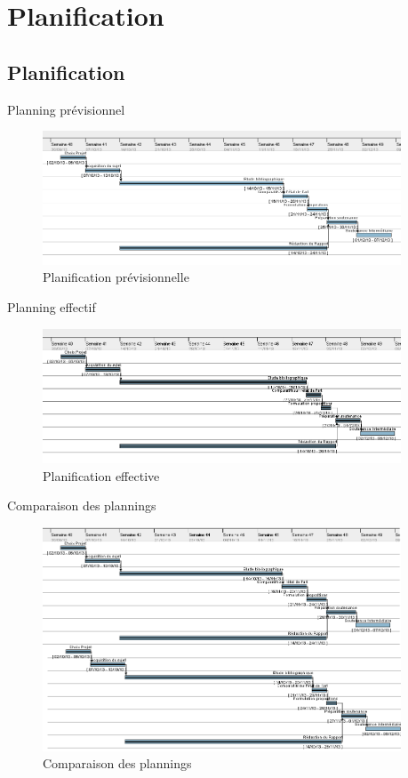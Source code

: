 \documentclass{beamer}
\begin{document}
\section{Planification}
\subsection{Planification}
\begin{frame}{Planning prévisionnel}
\begin{figure}
	\centering
		\includegraphics[width=0.95\textwidth]{p1_previsionnel}
	\caption{Planification prévisionnelle}
	\label{fig:PlanningPrevisionnel}
\end{figure}
\end{frame}
\begin{frame}{Planning effectif}
\begin{figure}
	\centering
		\includegraphics[width=0.95\textwidth]{p1_effectif}
	\caption{Planification effective}
	\label{fig:PlanningEffectif}
\end{figure}
\end{frame}
\begin{frame}{Comparaison des plannings}
\begin{figure}
	\centering
		\includegraphics[width=0.95\textwidth]{p1_previ_effe}
	\caption{Comparaison des plannings}
	\label{fig:PlanningEffePrevi}
\end{figure}
\end{frame}
\end{document}
